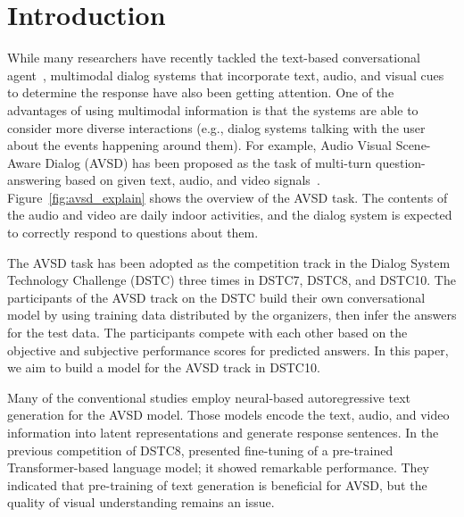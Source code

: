 \documentclass[letterpaper]{article} %
\begin{document}
\section{Introduction}
While many researchers have recently tackled the text-based conversational agent~\cite{Heck2020trippy,Xu2021beyond}, multimodal dialog systems that incorporate text, audio, and visual cues to determine the response have also been getting attention.
%
One of the advantages of using multimodal information is that the systems are able to consider more diverse interactions (e.g., dialog systems talking with the user about the events happening around them).
For example, Audio Visual Scene-Aware Dialog (AVSD) has been proposed as the task of multi-turn question-answering based on given text, audio, and video signals~\cite{Nguyen2018from,Hori2019joint,Li2021bridging}.
Figure~\ref{fig:avsd_explain} shows the overview of the AVSD task.
The contents of the audio and video are daily indoor activities, and the dialog system is expected to correctly respond to questions about them.

The AVSD task has been adopted as the competition track in the Dialog System Technology Challenge (DSTC) three times in DSTC7, DSTC8, and DSTC10.
The participants of the AVSD track on the DSTC build their own conversational model by using training data distributed by the organizers, then infer the answers for the test data.
%
The participants compete with each other based on the objective and subjective performance scores for predicted answers.
In this paper, we aim to build a model for the AVSD track in DSTC10.

Many of the conventional studies employ neural-based autoregressive text generation for the AVSD model.
Those models encode the text, audio, and video information into latent representations and generate response sentences.
In the previous competition of DSTC8, \citet{Li2021bridging} presented fine-tuning of a pre-trained Transformer-based language model; it showed remarkable performance.
They indicated that pre-training of text generation is beneficial for AVSD, but the quality of visual understanding remains an issue.
\end{document}
